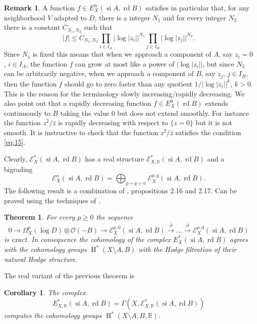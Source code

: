 \documentclass[11pt,a4paper]{amsart}
\newcommand{\R}{\mathds{R}}
\newcommand{\caO}{\mathcal{O}}
\newcommand{\sE}{\mathscr{E}}
\DeclareMathOperator{\si}{si}
\DeclareMathOperator{\rd}{rd}
\DeclareMathOperator{\rH}{H}
\numberwithin{equation}{section}
\theoremstyle{plain}
\newtheorem{cor}[prop]{Corollary}
\newtheorem{thm}[prop]{Theorem}
\theoremstyle{definition}
\newtheorem{rmk}[prop]{Remark}
\begin{document}
\begin{rmk}\label{rmk-4-2}
  A function $f\in E_{X}^0(\si A,\rd B)$ satisfies in particular that, for
  any neighborhood $V$ adapted to $D$, there is a integer $N_{1}$ and
  for every integer $N_{2}$ there is a constant $C_{N_{1},N_{2}}$ such
  that
  \begin{displaymath}
    | f |\le C_{N_1,N_2}
    \prod_{i\in I_A}|\log|z_i||^{N_1}
      \prod_{j\in I_B}|\log|z_j||^{N_2}.    
    \end{displaymath}
    Since $N_{1}$ is fixed this means that when we approach a
    component of $A$, say $z_{i}=0$, $i\in I_{A}$, the
    function $f$ can grow at most like a power of $|\log |z_{i}||$,
    but since $N_{2}$ can be arbitrarily negative, when we approach a
    component of $B$, say $z_{j}$, $j\in I_{B}$, then the function $f$
    should go to zero faster than any quotient $1/|\log |z_{i}||^{k}$,
    $k>0$. This is the reason for the terminology slowly
    increasing/rapidly decreasing. We also point out that a rapidly
    decreasing function   $f\in E_{X}^0(\rd B)$ extends continuously to
    $B$ taking the value $0$ but does not extend smoothly. For
    instance the function $z^{2}/\bar z$ is rapidly decreasing with
    respect to $\{z=0\}$ but it is not smooth.  It is instructive to
    check that the function $z^{2}/\bar z$ satisfies the condition
    \eqref{eq:15}. 
\end{rmk}

Clearly, $\sE_{X}^\ast(\si A,\rd B)$ has a real structure
$\sE_{X,\R}^\ast(\si A,\rd B)$ and a bigrading
\begin{displaymath}
  \sE_{X}^n(\si A,\rd B)= \bigoplus_{p+q=n} \sE_{X}^{p,q}(\si A,\rd B).
\end{displaymath}
The following result is a combination of
\cite{BCLR:_temper_delig_shimur},  propositions 2.16 and 2.17. Can be
proved using the techniques 
of \cite[Proposition 2.17]{BCLR:_temper_delig_shimur}.
\begin{thm}\label{thm:3}
  For every $p\ge 0$ the sequence
  \begin{displaymath}
    0\to \Omega_{X} ^p(\log D)\otimes \caO(-B)
    \to \sE_{X}^{p,0}(\si A,\rd B)
    \overset{\bar \partial}{\longrightarrow}\dots
    \overset{\bar \partial}{\longrightarrow}
    \sE_{X}^{p,d}(\si A,\rd B)
  \end{displaymath}
  is exact. In consequence the cohomology of the complex
  \begin{math}
    E_{X}^{\ast}(\si A,\rd B)
  \end{math}
  agrees with the cohomology groups $\rH^{\ast}(X\setminus A,B)$ with
  the Hodge filtration of their natural Hodge structure. 
\end{thm}
The real variant of the previous theorem is  
\begin{cor}\label{thm:4}
  The complex 
  \begin{displaymath}
    E^{\ast}_{X,\R}(\si A,\rd B)=\Gamma(X,\sE_{X,\R}^{\ast}(\si A,\rd B))
  \end{displaymath}
  computes the cohomology groups $\rH^{\ast}(X\setminus A,B,\R)$.  
\end{cor}
\end{document}
